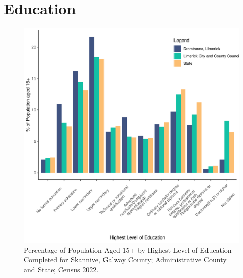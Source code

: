 \documentclass{article}
\begin{document}
\section{Education}\label{sect:Edu}
\begin{figure}[H]
	\centering
	\includegraphics[width = 120mm]{../figures/EduED.pdf}
	\caption{Percentage of Population Aged 15+ by Highest Level of Education Completed for Skannive, Galway County; Administrative County and State; Census 2022.}
	\label{fig:vbnv}
	\end{figure}
\end{document}
